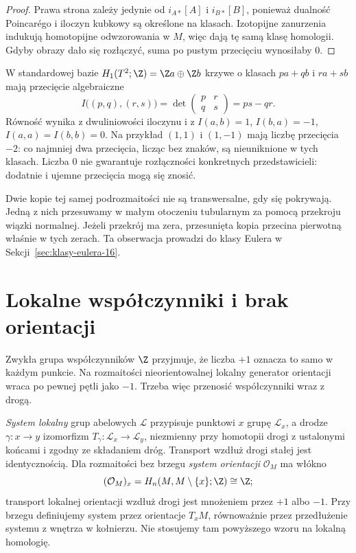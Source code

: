 \begin{proof}
Prawa strona zależy jedynie
od $i_{A*}[A]$ i $i_{B*}[B]$,
ponieważ dualność Poincarégo
i iloczyn kubkowy są
określone na klasach.
Izotopijne zanurzenia
indukują homotopijne
odwzorowania w $M$,
więc dają tę samą
klasę homologii.
Gdyby obrazy dało się
rozłączyć, suma po
pustym przecięciu
wynosiłaby $0$.
\end{proof}

\begin{przyklad}
W standardowej bazie
$H_1(T^2;\Z)=\Z a\oplus\Z b$
krzywe o klasach
$pa+qb$ i $ra+sb$
mają przecięcie algebraiczne
\[
 I\bigl((p,q),(r,s)\bigr)
 =\det\begin{pmatrix}p&r\\q&s\end{pmatrix}
 =ps-qr.
\]
Równość wynika z dwuliniowości
iloczynu i z
$I(a,b)=1$, $I(b,a)=-1$,
$I(a,a)=I(b,b)=0$.
Na przykład $(1,1)$ i $(1,-1)$
mają liczbę przecięcia $-2$:
co najmniej dwa przecięcia,
licząc bez znaków, są
nieuniknione w tych klasach.
Liczba $0$ nie gwarantuje
rozłączności konkretnych
przedstawicieli: dodatnie
i ujemne przecięcia mogą
się znosić.
\end{przyklad}

\begin{uwaga}[Samoprzecięcie]
Dwie kopie tej samej
podrozmaitości nie są
transwersalne, gdy się
pokrywają. Jedną z nich
przesuwamy w małym
otoczeniu tubularnym
za pomocą przekroju
wiązki normalnej.
Jeżeli przekrój ma zera,
przesunięta kopia
przecina pierwotną
właśnie w tych zerach.
Ta obserwacja prowadzi
do klasy Eulera
w Sekcji~\ref{sec:klasy-eulera-16}.
\end{uwaga}

\section{Lokalne współczynniki i brak orientacji}
\label{sec:lokalne-wsp-16}

Zwykła grupa współczynników
$\Z$ przyjmuje, że liczba
$+1$ oznacza to samo w
każdym punkcie. Na rozmaitości
nieorientowalnej lokalny
generator orientacji wraca
po pewnej pętli jako $-1$.
Trzeba więc przenosić
współczynniki wraz z drogą.

\begin{definicja}
\label{def:system-lokalny-16}
\emph{System lokalny} grup abelowych
$\mathcal L$ przypisuje punktowi
$x$ grupę $\mathcal L_x$,
a drodze $\gamma:x\to y$
izomorfizm
$T_\gamma:\mathcal L_x\to\mathcal L_y$,
niezmienny przy homotopii
drogi z ustalonymi końcami
i zgodny ze składaniem dróg.
Transport wzdłuż drogi stałej jest identycznością.
Dla rozmaitości bez brzegu \emph{system orientacji}
$\mathcal O_M$ ma włókno
\[
 (\mathcal O_M)_x
  =H_n(M,M\setminus\{x\};\Z)
  \cong\Z;
\]
transport lokalnej orientacji
wzdłuż drogi jest mnożeniem
przez $+1$ albo $-1$. Przy brzegu definiujemy
system przez orientacje $T_xM$, równoważnie przez
przedłużenie systemu z wnętrza w kołnierzu.
Nie stosujemy tam powyższego wzoru na lokalną homologię.
\end{definicja}

